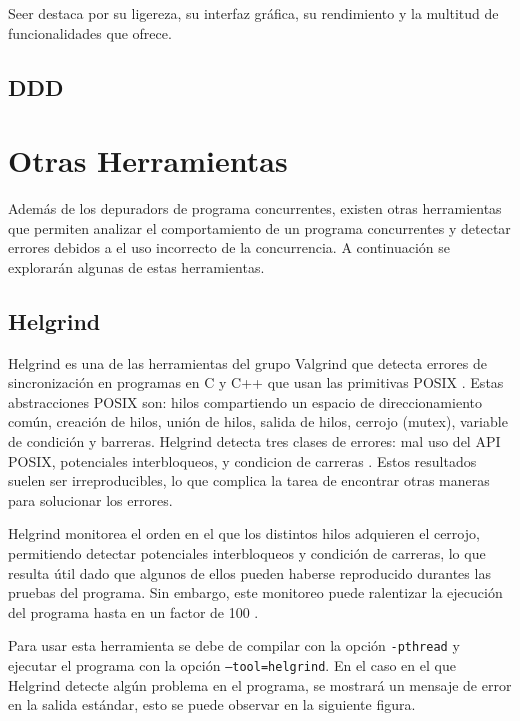 Seer destaca por su ligereza, su \gls{interfaz gráfica}, su rendimiento y la multitud de funcionalidades que ofrece.


\subsection{DDD}{\label{subsec:ddd}}

\section{Otras Herramientas}\label{sec:herramientas}

Además de los \glspl{depurador} de \glspl{programa concurrente}, existen otras herramientas que permiten analizar el comportamiento de un \glspl{programa concurrente} y detectar errores debidos a el uso incorrecto de la \gls{concurrencia}. A continuación se explorarán algunas de estas herramientas.

\subsection{Helgrind}{\label{subsec:helgrind}}

Helgrind es una de las herramientas del grupo Valgrind que detecta errores de sincronización en programas en C y C++ que usan las primitivas POSIX \cite{POSIX}. Estas abstracciones POSIX son: \glspl{hilo} compartiendo un espacio de direccionamiento común, creación de \glspl{hilo}, unión de \glspl{hilo}, salida de \glspl{hilo}, \gls{cerrojo} (mutex), \gls{variable de condición} y \gls{barreras}. Helgrind detecta tres clases de errores: mal uso del API POSIX, potenciales \glspl{interbloqueo}, y \glspl{condicion de carrera} \cite{Helgrind}. 
Estos resultados suelen ser irreproducibles, lo que complica la tarea de encontrar otras maneras para solucionar los errores.

Helgrind monitorea el orden en el que los distintos \glspl{hilo} adquieren el \gls{cerrojo}, permitiendo detectar potenciales \glspl{interbloqueo} y \glspl{condición de carrera}, lo que resulta útil dado que algunos de ellos pueden haberse reproducido durantes las pruebas del programa. Sin embargo, este monitoreo puede ralentizar la ejecución del programa hasta en un factor de 100 \cite{Helgrind}.

Para usar esta herramienta se debe de compilar con la opción \texttt{-pthread} y ejecutar el programa con la opción \texttt{--tool=helgrind}. En el caso en el que Helgrind detecte algún problema en el programa, se mostrará un mensaje de error en la \gls{salida estándar}, esto se puede observar en la siguiente figura.


